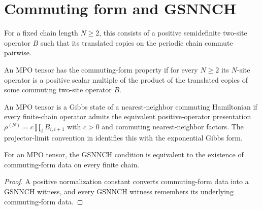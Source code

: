 \section{Commuting form and GSNNCH}

\begin{definition}
    \label{def:mpdo_commuting_form_data}
    \leanok
    For a fixed chain length $N \ge 2$, this consists of a positive
    semidefinite two-site operator $B$ such that its translated copies on the
    periodic chain commute pairwise.
\end{definition}

\begin{definition}
    \label{def:mpdo_has_commuting_form}
    \leanok
    An MPO tensor has the commuting-form property if for every $N \ge 2$ its
    $N$-site operator is a positive scalar multiple of the product of the
    translated copies of some commuting two-site operator $B$.
\end{definition}

\begin{definition}[GSNNCH]
    \label{def:mpdo_is_gsnnch}
    \leanok
    An MPO tensor is a Gibbs state of a nearest-neighbor commuting Hamiltonian
    if every finite-chain operator admits the equivalent positive-operator
    presentation $\rho^{(N)} = c \prod_i B_{i,i+1}$ with $c > 0$ and
    commuting nearest-neighbor factors. The projector-limit convention in
    \cite{Cirac2016MPDO_arXiv}
    identifies this with the exponential Gibbs form.
\end{definition}

\begin{theorem}
    \label{thm:mpdo_is_gsnnch_iff_has_commuting_form}
    \leanok
    For an MPO tensor, the GSNNCH condition is equivalent to the existence of
    commuting-form data on every finite chain.
\end{theorem}

\begin{proof}\leanok
    A positive normalization constant converts commuting-form data into a GSNNCH
    witness, and every GSNNCH witness remembers its underlying commuting-form data.
\end{proof}

